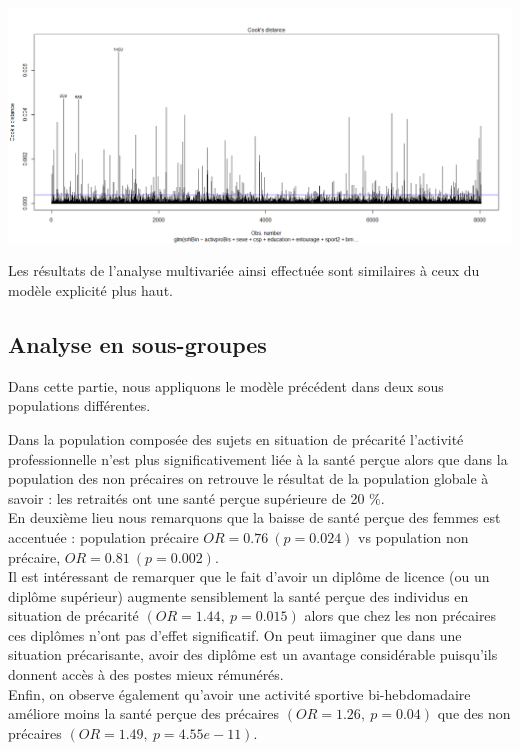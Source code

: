 \documentclass{book}
\begin{document}
\includegraphics[scale=.4]{cooks_distance.png}

Les résultats de l'analyse multivariée ainsi effectuée sont similaires à ceux du modèle explicité plus haut.\\

\subsection{Analyse en sous-groupes}

\noindent
Dans cette partie, nous appliquons le modèle précédent dans deux sous populations différentes.\\

\bigskip

\noindent
Dans la population composée des sujets en situation de précarité l'activité professionnelle n'est plus significativement liée à la santé perçue alors que dans la population des non précaires on retrouve le résultat de la population globale à savoir : les retraités ont une santé perçue supérieure de 20 $\%$.\\

\noindent
En deuxième lieu nous remarquons que la baisse de santé perçue des femmes est accentuée : population précaire $OR = 0.76 ~ (p = 0.024)$ vs population non précaire, $OR = 0.81 ~ (p = 0.002)$.\\

\noindent
Il est intéressant de remarquer que le fait d'avoir un diplôme de licence (ou un diplôme supérieur) augmente sensiblement la santé perçue des individus en situation de précarité $(OR = 1.44, ~p = 0.015)$ alors que chez les non précaires ces diplômes n'ont pas d'effet significatif. On peut iimaginer que dans une situation précarisante, avoir des diplôme est un avantage considérable puisqu'ils donnent accès à des postes mieux rémunérés.\\

\noindent
Enfin, on observe également qu'avoir une activité sportive bi-hebdomadaire améliore moins la santé perçue des précaires $(OR = 1.26, ~p = 0.04)$ que des non précaires $(OR = 1.49, ~p = 4.55e-11)$.\\
\end{document}
